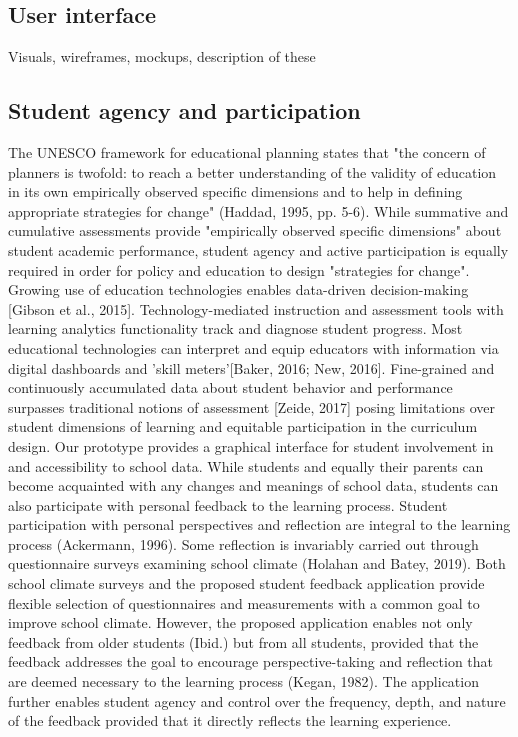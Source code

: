 \documentclass{article}
\begin{document}
\subsection{User interface}
Visuals, wireframes, mockups, description of these

\subsection{Student agency and participation}
The UNESCO framework for educational planning states that "the concern of planners is twofold: to reach a better understanding of the validity of education in its own empirically observed specific dimensions and to help in defining appropriate strategies for change" (Haddad, 1995, pp. 5-6).
\bigbreak
While summative and cumulative assessments provide "empirically observed specific dimensions" about student academic performance, student agency and active participation is equally required in order for policy and education to design "strategies for change". Growing use of education technologies enables data-driven decision-making [Gibson et al., 2015]. Technology-mediated instruction and assessment tools with learning analytics functionality track and diagnose student progress. Most educational technologies can interpret and equip educators with information via digital dashboards and 'skill meters'[Baker, 2016; New, 2016]. Fine-grained and continuously accumulated data about student behavior and performance surpasses traditional notions of assessment [Zeide, 2017] posing limitations over student dimensions of learning and equitable participation in the curriculum design.
\bigbreak
Our prototype provides a graphical interface for student involvement in and accessibility to school data. While students and equally their parents can become acquainted with any changes and meanings of school data, students can also participate with personal feedback to the learning process. Student participation with personal perspectives and reflection are integral to the learning process (Ackermann, 1996). Some reflection is invariably carried out through questionnaire surveys examining school climate (Holahan and Batey, 2019). Both school climate surveys and the proposed student feedback application provide flexible selection of questionnaires and measurements with a common goal to improve school climate. However, the proposed application enables not only feedback from older students (Ibid.) but from all students, provided that the feedback addresses the goal to encourage perspective-taking and reflection that are deemed necessary to the learning process (Kegan, 1982). The application further enables student agency and control over the frequency, depth, and nature of the feedback provided that it directly reflects the learning experience.
\end{document}
